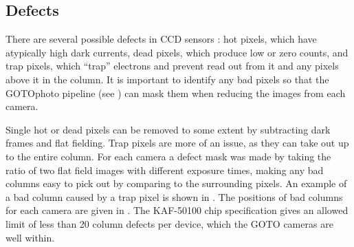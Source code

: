 \begin{colsection}
\begin{colsection}
\end{colsection}

\newpage
\subsection{Defects}
\label{sec:defects}
\begin{colsection}

There are several possible defects in CCD sensors \citep{CCDs}: hot pixels, which have atypically high dark currents, dead pixels, which produce low or zero counts, and trap pixels, which ``trap'' electrons and prevent read out from it and any pixels above it in the column. It is important to identify any bad pixels so that the GOTOphoto pipeline (see ) can mask them when reducing the images from each camera.

Single hot or dead pixels can be removed to some extent by subtracting dark frames and flat fielding. Trap pixels are more of an issue, as they can take out up to the entire column. For each camera a defect mask was made by taking the ratio of two flat field images with different exposure times, making any bad columns easy to pick out by comparing to the surrounding pixels. An example of a bad column caused by a trap pixel is shown in . The positions of bad columns for each camera are given in . The KAF-50100 chip specification gives an allowed limit of less than 20 column defects per device, which the GOTO cameras are well within.


\end{colsection}
\end{colsection}
